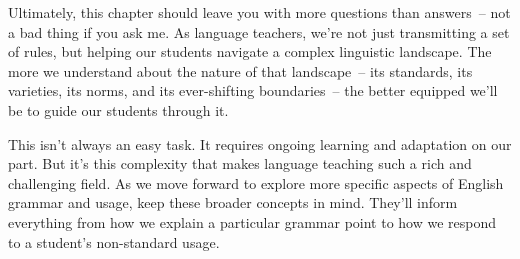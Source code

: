 Ultimately, this chapter should leave you with more questions than answers~-- not a bad thing if you ask me. As language teachers, we're not just transmitting a set of rules, but helping our students navigate a complex linguistic landscape. The more we understand about the nature of that landscape~-- its standards, its varieties, its norms, and its ever-shifting boundaries~-- the better equipped we'll be to guide our students through it.

This isn't always an easy task. It requires ongoing learning and adaptation on our part. But it's this complexity that makes language teaching such a rich and challenging field. As we move forward to explore more specific aspects of English grammar and usage, keep these broader concepts in mind. They'll inform everything from how we explain a particular grammar point to how we respond to a student's non-standard usage.
\newpage

